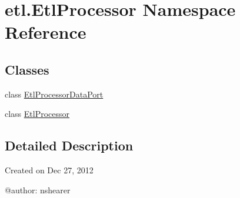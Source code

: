 \hypertarget{namespaceetl_1_1EtlProcessor}{\section{etl.\-Etl\-Processor Namespace Reference}
\label{namespaceetl_1_1EtlProcessor}
}
\subsection*{Classes}
\begin{DoxyCompactItemize}
\item 
class \hyperlink{classetl_1_1EtlProcessor_1_1EtlProcessorDataPort}{Etl\-Processor\-Data\-Port}
\item 
class \hyperlink{classetl_1_1EtlProcessor_1_1EtlProcessor}{Etl\-Processor}
\end{DoxyCompactItemize}


\subsection{Detailed Description}
\begin{DoxyVerb}Created on Dec 27, 2012

@author: nshearer
\end{DoxyVerb}
 